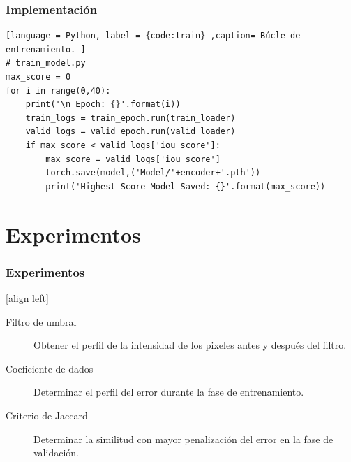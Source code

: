 \documentclass{beamer}
\begin{document}
\begin{frame}[fragile]
\frametitle{Implementación}
\begin{lstlisting}[language = Python, label = {code:train} ,caption= Búcle de entrenamiento. ]
# train_model.py
max_score = 0 
for i in range(0,40):
    print('\n Epoch: {}'.format(i))
    train_logs = train_epoch.run(train_loader)
    valid_logs = valid_epoch.run(valid_loader)
    if max_score < valid_logs['iou_score']:
        max_score = valid_logs['iou_score']
        torch.save(model,('Model/'+encoder+'.pth'))
        print('Highest Score Model Saved: {}'.format(max_score))
\end{lstlisting}
\end{frame}

\section{Experimentos}

\begin{frame}
    \frametitle{Experimentos}
    [align left]
    \begin{description}
        \item[Filtro de umbral] Obtener el perfil de la intensidad de los pixeles antes y después del filtro.
        \item[Coeficiente de dados] Determinar el perfil del error durante la fase de entrenamiento.
        \item[Criterio de Jaccard] Determinar la similitud con mayor penalización del error en la fase de validación.   
    \end{description}
\end{frame}
\end{document}
